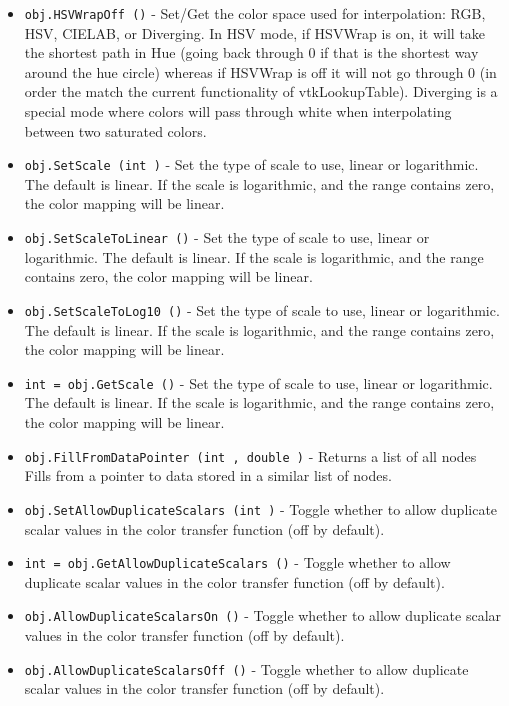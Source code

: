 \begin{itemize}
\item  \verb|obj.HSVWrapOff ()| -  Set/Get the color space used for interpolation: RGB, HSV, CIELAB, or
 Diverging.  In HSV mode, if HSVWrap is on, it will take the shortest path
 in Hue (going back through 0 if that is the shortest way around the hue
 circle) whereas if HSVWrap is off it will not go through 0 (in order the
 match the current functionality of vtkLookupTable).  Diverging is a special
 mode where colors will pass through white when interpolating between two
 saturated colors.

\item  \verb|obj.SetScale (int )| -  Set the type of scale to use, linear or logarithmic.  The default
 is linear.  If the scale is logarithmic, and the range contains
 zero, the color mapping will be linear.

\item  \verb|obj.SetScaleToLinear ()| -  Set the type of scale to use, linear or logarithmic.  The default
 is linear.  If the scale is logarithmic, and the range contains
 zero, the color mapping will be linear.

\item  \verb|obj.SetScaleToLog10 ()| -  Set the type of scale to use, linear or logarithmic.  The default
 is linear.  If the scale is logarithmic, and the range contains
 zero, the color mapping will be linear.

\item  \verb|int = obj.GetScale ()| -  Set the type of scale to use, linear or logarithmic.  The default
 is linear.  If the scale is logarithmic, and the range contains
 zero, the color mapping will be linear.

\item  \verb|obj.FillFromDataPointer (int , double )| -  Returns a list of all nodes
 Fills from a pointer to data stored in a similar list of nodes.

\item  \verb|obj.SetAllowDuplicateScalars (int )| -  Toggle whether to allow duplicate scalar values in the color transfer
 function (off by default).

\item  \verb|int = obj.GetAllowDuplicateScalars ()| -  Toggle whether to allow duplicate scalar values in the color transfer
 function (off by default).

\item  \verb|obj.AllowDuplicateScalarsOn ()| -  Toggle whether to allow duplicate scalar values in the color transfer
 function (off by default).

\item  \verb|obj.AllowDuplicateScalarsOff ()| -  Toggle whether to allow duplicate scalar values in the color transfer
 function (off by default).

\end{itemize}

